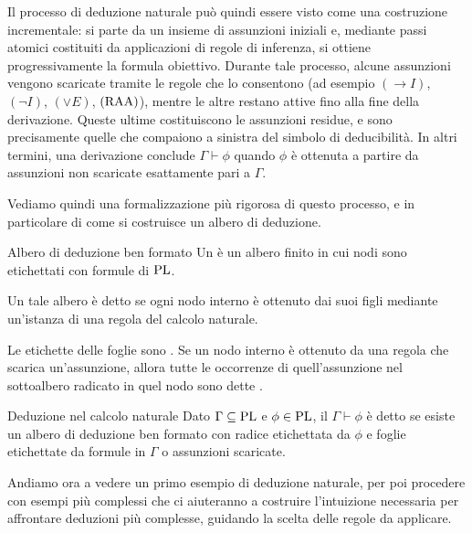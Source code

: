 Il processo di deduzione naturale può quindi essere visto come una costruzione incrementale: si parte da un insieme di assunzioni iniziali e, mediante passi atomici costituiti da applicazioni di regole di inferenza, si ottiene progressivamente la formula obiettivo.
Durante tale processo, alcune assunzioni vengono scaricate tramite le regole che lo consentono (ad esempio \((\to I)\), \((\neg I)\), \((\lor E)\), \((\operatorname{RAA})\)), mentre le altre restano attive fino alla fine della derivazione.
Queste ultime costituiscono le assunzioni residue, e sono precisamente quelle che compaiono a sinistra del simbolo di deducibilità.
In altri termini, una derivazione conclude \(\Gamma \vdash \phi\) quando \(\phi\) è ottenuta a partire da assunzioni non scaricate esattamente pari a \(\Gamma\).

Vediamo quindi una formalizzazione più rigorosa di questo processo, e in particolare di come si costruisce un albero di deduzione.

\begin{definition}{Albero di deduzione ben formato}
  Un  è un albero finito in cui nodi sono etichettati con formule di \(\operatorname{PL}\).
  
  Un tale albero è detto  se ogni nodo interno è ottenuto dai suoi figli mediante un'istanza di una regola del calcolo naturale.
  
  Le etichette delle foglie sono .
  Se un nodo interno è ottenuto da una regola che scarica un'assunzione, allora tutte le occorrenze di quell'assunzione nel sottoalbero radicato in quel nodo sono dette .
\end{definition}

\begin{definition}{Deduzione nel calcolo naturale}
  Dato \(\Gamma\subseteq \operatorname{PL}\) e \(\phi\in\operatorname{PL}\), il  \(\Gamma \vdash \phi\) è detto  se esiste un albero di deduzione ben formato con radice etichettata da \(\phi\) e foglie etichettate da formule in \(\Gamma\) o assunzioni scaricate.
\end{definition}

Andiamo ora a vedere un primo esempio di deduzione naturale, per poi procedere con esempi più complessi che ci aiuteranno a costruire l'intuizione necessaria per affrontare deduzioni più complesse, guidando la scelta delle regole da applicare.

